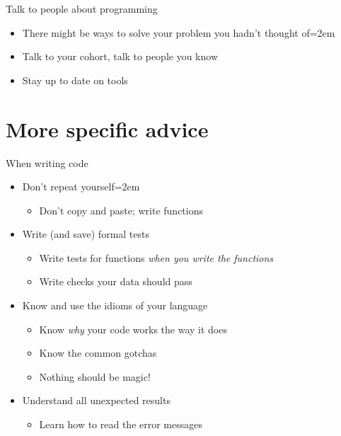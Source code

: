 \documentclass{beamer}
\begin{document}
\begin{frame}{Talk to people about programming}
    \begin{itemize}
        \item There might be ways to solve your problem you hadn't thought of\itemsep=2em
        \item Talk to your cohort, talk to people you know
        \item Stay up to date on tools
    \end{itemize}
\end{frame}

\section{More specific advice}


\begin{frame}{When writing code}
    \begin{itemize}
        \item Don't repeat yourself\itemsep=2em
        \begin{itemize}
            \item Don't copy and paste; write functions
        \end{itemize}
        \item<2-> Write (and save) formal tests
        \begin{itemize}
            \item Write tests for functions \textit{when you write the functions}
            \item Write checks your data should pass
        \end{itemize}
        \item<3-> Know and use the idioms of your language
        \begin{itemize}
            \item Know \textit{why} your code works the way it does
            \item Know the common gotchas
            \item Nothing should be magic!
        \end{itemize}
        \item<4-> Understand all unexpected results
        \begin{itemize}
            \item Learn how to read the error messages
        \end{itemize}
    \end{itemize}
\end{frame}
\end{document}
